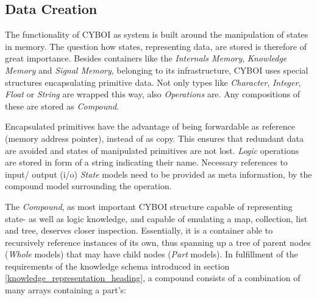 %
%
%
%
%
%
%

\subsection{Data Creation}
\label{data_creation_heading}

The functionality of CYBOI as system is built around the manipulation of states
in memory. The question how states, representing data, are stored is therefore
of great importance. Besides containers like the \emph{Internals Memory},
\emph{Knowledge Memory} and \emph{Signal Memory}, belonging to its
infrastructure, CYBOI uses special structures encapsulating primitive data. Not
only types like \emph{Character}, \emph{Integer}, \emph{Float} or \emph{String}
are wrapped this way, also \emph{Operations} are. Any compositions of these are
stored as \emph{Compound}.

Encapsulated primitives have the advantage of being forwardable as reference
(memory address pointer), instead of as copy. This ensures that redundant data
are avoided and states of manipulated primitives are not lost. \emph{Logic}
operations are stored in form of a string indicating their name. Necessary
references to input/ output (i/o) \emph{State} models need to be provided as
meta information, by the compound model surrounding the operation.

The \emph{Compound}, as most important CYBOI structure capable of representing
state- as well as logic knowledge, and capable of emulating a map, collection,
list and tree, deserves closer inspection. Essentially, it is a container able
to recursively reference instances of its own, thus spanning up a tree of parent
nodes (\emph{Whole} models) that may have child nodes (\emph{Part} models). In
fulfillment of the requirements of the knowledge schema introduced in section
\ref{knowledge_representation_heading}, a compound consists of a combination of
many arrays containing a part's:

